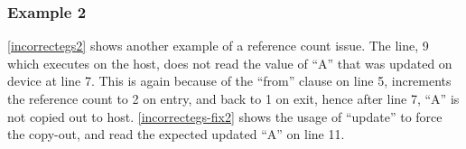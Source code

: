 \subsubsection{Example 2} 
\autoref{incorrectegs2} shows another example of a reference count issue. 
The line, 9 which executes on the host, does not read
the value of ``A'' that was updated on device at line 7. 
This is again because of the ``from'' clause on line 5, increments 
the reference count to 2 on entry, and back to 1 on exit, hence 
after line 7, ``A'' is not copied out to host.
\autoref{incorrectegs-fix2} shows the usage of ``update'' 
to force the copy-out, and read the expected updated ``A'' on line 11.

